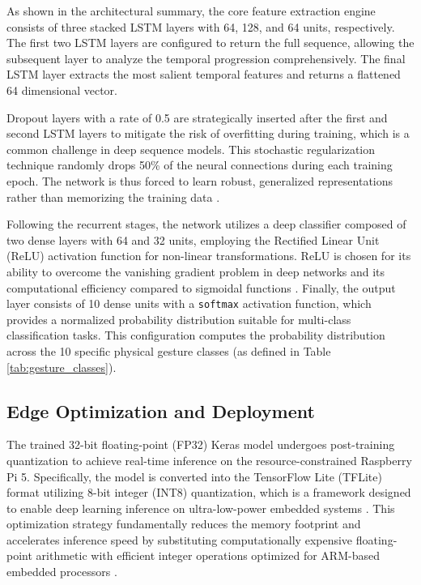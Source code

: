 As shown in the architectural summary, the core feature extraction engine consists of three stacked LSTM layers with 64, 128, and 64 units, respectively. The first two LSTM layers are configured to return the full sequence, allowing the subsequent layer to analyze the temporal progression comprehensively. The final LSTM layer extracts the most salient temporal features and returns a flattened 64 dimensional vector. 

Dropout layers with a rate of 0.5 are strategically inserted after the first and second LSTM layers to mitigate the risk of overfitting during training, which is a common challenge in deep sequence models. This stochastic regularization technique randomly drops 50\% of the neural connections during each training epoch. The network is thus forced to learn robust, generalized representations rather than memorizing the training data \cite{labach2019survey}.

Following the recurrent stages, the network utilizes a deep classifier composed of two dense layers with 64 and 32 units, employing the Rectified Linear Unit (ReLU) activation function for non-linear transformations. ReLU is chosen for its ability to overcome the vanishing gradient problem in deep networks and its computational efficiency compared to sigmoidal functions \cite{dubey2022activation}. Finally, the output layer consists of 10 dense units with a \texttt{softmax} activation function, which provides a normalized probability distribution suitable for multi-class classification tasks. This configuration computes the probability distribution across the 10 specific physical gesture classes (as defined in Table \ref{tab:gesture_classes}).



\subsection{Edge Optimization and Deployment}

The trained 32-bit floating-point (FP32) Keras model undergoes post-training quantization to achieve real-time inference on the resource-constrained Raspberry Pi 5. Specifically, the model is converted into the TensorFlow Lite (TFLite) format utilizing 8-bit integer (INT8) quantization, which is a framework designed to enable deep learning inference on ultra-low-power embedded systems \cite{david2021tflite}. This optimization strategy fundamentally reduces the memory footprint and accelerates inference speed by substituting computationally expensive floating-point arithmetic with efficient integer operations optimized for ARM-based embedded processors \cite{orasan2022quantization}.

